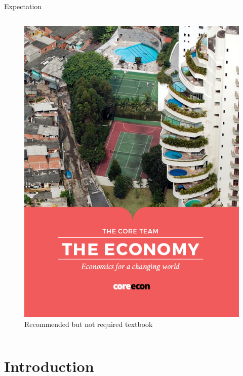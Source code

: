 \documentclass[11pt,aspectratio=43,usenames,dvipsnames]{beamer}
\theoremstyle{definition}
\begin{document}
\begin{frame}{Expectation}
\begin{columns}
\begin{column}{0.4\textwidth}
\begin{figure}
                \includegraphics[width=\textwidth]{./figures/the-economy-cover.jpeg}
                \caption{Recommended but not required textbook}
            \end{figure}
        \end{column}
    \end{columns}
\end{frame}

\section[Intro]{Introduction}
\label{sec:Introduction}
\end{document}
